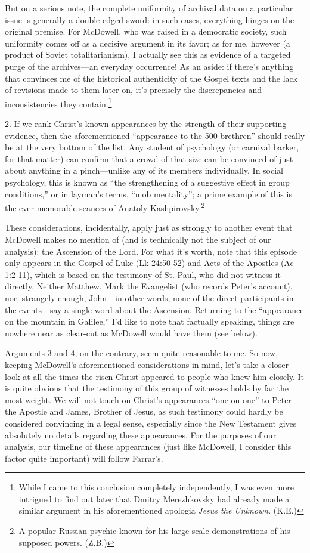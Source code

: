 But on a serious note, the complete uniformity of archival data on a particular issue is generally a double-edged sword: in such cases, everything hinges on the original premise. For McDowell, who was raised in a democratic society, such uniformity comes off as a decisive argument in its favor; as for me, however (a product of Soviet totalitarianism), I actually see this as evidence of a targeted purge of the archives---an everyday occurrence! As an aside: if there's anything that convinces me of the historical authenticity of the Gospel texts and the lack of revisions made to them later on, it's precisely the discrepancies and inconsistencies they contain.\footnote{While I came to this conclusion completely independently, I was even more intrigued to find out later that Dmitry Merezhkovsky had already made a similar argument in his aforementioned apologia \emph{Jesus the Unknown}. (K.E.)}

2. If we rank Christ's known appearances by the strength of their supporting evidence, then the aforementioned ``appearance to the 500 brethren'' should really be at the very bottom of the list. Any student of psychology (or carnival barker, for that matter) can confirm that a crowd of that size can be convinced of just about anything in a pinch---unlike any of its members individually. In social psychology, this is known as ``the strengthening of a suggestive effect in group conditions,'' or in layman's terms, ``mob mentality''; a prime example of this is the ever-memorable seances of Anatoly Kashpirovsky.\footnote{A popular Russian psychic known for his large-scale demonstrations of his supposed powers. (Z.B.)}

These considerations, incidentally, apply just as strongly to another event that McDowell makes no mention of (and is technically not the subject of our analysis): the Ascension of the Lord. For what it's worth, note that this episode only appears in the Gospel of Luke (Lk 24:50-52) and Acts of the Apostles (Ac 1:2-11), which is based on the testimony of St. Paul, who did not witness it directly. Neither Matthew, Mark the Evangelist (who records Peter's account), nor, strangely enough, John---in other words, none of the direct participants in the events---say a single word about the Ascension. Returning to the ``appearance on the mountain in Galilee,'' I'd like to note that factually speaking, things are nowhere near as clear-cut as McDowell would have them (see below).

Arguments 3 and 4, on the contrary, seem quite reasonable to me. So now, keeping McDowell's aforementioned considerations in mind, let's take a closer look at all the times the risen Christ appeared to people who knew him closely. It is quite obvious that the testimony of this group of witnesses holds by far the most weight. We will not touch on Christ's appearances ``one-on-one'' to Peter the Apostle and James, Brother of Jesus, as such testimony could hardly be considered convincing in a legal sense, especially since the New Testament gives absolutely no details regarding these appearances. For the purposes of our analysis, our timeline of these appearances (just like McDowell, I consider this factor quite important) will follow Farrar's.

